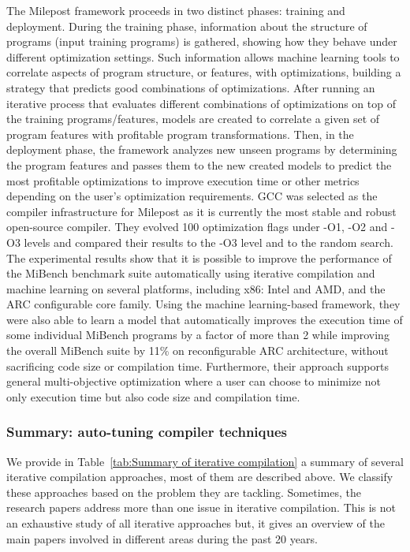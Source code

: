 The Milepost framework proceeds in two distinct phases: training and deployment. During the training phase, information about the structure of programs (input training programs) is gathered, showing how they behave under different optimization settings. Such information allows machine learning tools to correlate aspects of program structure, or features, with optimizations, building a strategy that predicts good combinations of optimizations. 
After running an iterative process that evaluates different combinations of optimizations on top of the training programs/features,  models are created to correlate a given set of program features with profitable program transformations. 
Then, in the deployment phase, the framework analyzes new unseen programs by determining the program features and passes them to the new created models to predict the most profitable optimizations to improve execution time or other metrics depending on the user’s optimization requirements.
GCC was selected as the compiler infrastructure for Milepost as it is currently the most stable and robust open-source compiler. They evolved 100 optimization flags under -O1, -O2 and -O3 levels and compared their results to the -O3 level and to the random search.
The experimental results show that it is possible to improve the performance of the MiBench benchmark suite automatically using iterative compilation and machine learning on several platforms, including x86: Intel and AMD, and the ARC configurable core family. Using the machine learning-based framework, they were also able to learn a model that automatically improves the execution time of some individual MiBench programs by a factor of more than 2 while improving the overall MiBench suite by 11\% on reconfigurable ARC architecture, without sacrificing code size or compilation time. Furthermore, their approach supports general multi-objective optimization where a user can choose to minimize not only execution time but also code size and compilation time.



\subsubsection{Summary: auto-tuning compiler techniques}
We provide in Table~\ref{tab:Summary of iterative compilation} a summary of several iterative compilation approaches, most of them are described above. We classify these approaches based on the problem they are tackling. Sometimes, the research papers address more than one issue in iterative compilation. This is not an exhaustive study of all iterative approaches but, it gives an overview of the main papers involved in different areas during the past 20 years.

